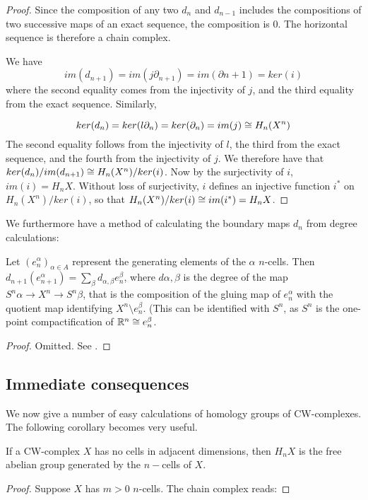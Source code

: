 \begin{definitions}
\begin{proof}
Since the composition of any two $d_n$ and $d_{n-1}$ includes the compositions of two successive maps of an exact sequence, the composition is $0$. The horizontal sequence is therefore a chain complex.

We have $$im(d_{n+1})=im(j \partial_{n+1})=im(\partial{n+1})=ker(i)$$
where the second equality comes from the injectivity of $j$, and the third equality from the exact sequence. Similarly,

$$ker(d_n)=ker(l \partial_n)=ker(\partial_n)=im(j)\cong H_n(X^n)$$
The second equality follows from the injectivity of $l$, the third from the exact sequence, and the fourth from the injectivity of $j$. We therefore have that 
$ker(d_n)/im(d_{n+1})\cong H_n(X^n)/ker(i)$. Now by the surjectivity of $i$, $im(i)=H_n X$. Without loss of surjectivity, $i$ defines an injective function $i^*$ on $H_n(X^n)/ker(i)$, so that $H_n(X^n)/ker(i)\cong im(i^*)=H_n X$.\cite{Hatcher}\end{proof}

We furthermore have a method of calculating the boundary maps $d_n$ from degree calculations:
\begin{theorem}\label{boundary-formula} Let $(e^{\alpha}_n)_{\alpha\in A}$ represent the generating elements of the $\alpha$ $n$-cells. Then 
$d_{n+1}(e^{\alpha}_{n+1})=\sum_{\beta} d_{\alpha,\beta} e^{\beta}_{n}$, where $d{\alpha,\beta}$ is the degree of the map $S^{n}\alpha\rightarrow X^n\rightarrow S^n\beta$, that is the composition of the gluing map of $e^{\alpha}_n$ with the quotient map identifying $X^n\setminus e^{\beta}_n$. (This can be identified with $S^n$, as $S^n$ is the one-point compactification of $\mathbb{R}^n\cong e^{\beta}_n$.
\end{theorem}
\begin{proof}
Omitted. See \cite{Hatcher}.
\end{proof}

\subsection{Immediate consequences}
We now give a number of easy calculations of homology groups of CW-complexes. The following corollary becomes very useful.

\begin{corollary}\label{cell-adjacent} If a CW-complex $X$ has no cells in adjacent dimensions, then $H_n X$ is the free abelian group generated by the $n-$cells of $X$.
\end{corollary}
\begin{proof}
Suppose $X$ has $m>0$ $n$-cells. The chain complex reads:


\end{proof}
\end{definitions}
